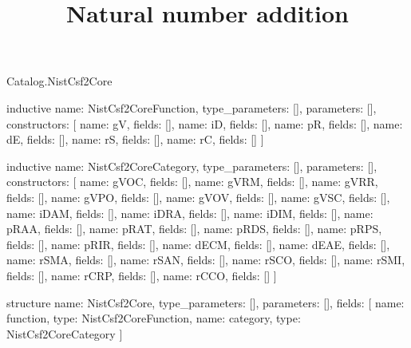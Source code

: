 \begin{lexlean}{Catalog.NistCsf2Core}
\title{Natural number addition}
\begin{semanticmodule}
inductive{
  name: NistCsf2CoreFunction,
  type_parameters: [],
  parameters: [],
  constructors: [
    {name: gV, fields: []},
    {name: iD, fields: []},
    {name: pR, fields: []},
    {name: dE, fields: []},
    {name: rS, fields: []},
    {name: rC, fields: []}
  ]
}

inductive{
  name: NistCsf2CoreCategory,
  type_parameters: [],
  parameters: [],
  constructors: [
    {name: gVOC, fields: []},
    {name: gVRM, fields: []},
    {name: gVRR, fields: []},
    {name: gVPO, fields: []},
    {name: gVOV, fields: []},
    {name: gVSC, fields: []},
    {name: iDAM, fields: []},
    {name: iDRA, fields: []},
    {name: iDIM, fields: []},
    {name: pRAA, fields: []},
    {name: pRAT, fields: []},
    {name: pRDS, fields: []},
    {name: pRPS, fields: []},
    {name: pRIR, fields: []},
    {name: dECM, fields: []},
    {name: dEAE, fields: []},
    {name: rSMA, fields: []},
    {name: rSAN, fields: []},
    {name: rSCO, fields: []},
    {name: rSMI, fields: []},
    {name: rCRP, fields: []},
    {name: rCCO, fields: []}
  ]
}

structure{
  name: NistCsf2Core,
  type_parameters: [],
  parameters: [],
  fields: [
    {name: function, type: NistCsf2CoreFunction},
    {name: category, type: NistCsf2CoreCategory}
  ]
}
\end{semanticmodule}
\end{lexlean}
